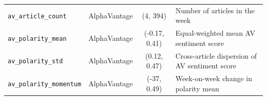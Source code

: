 \documentclass[preprint,12pt,authoryear]{elsarticle}
\begin{document}
\begin{longtable}{llcp{5.5cm}}
\texttt{av\_article\_count}        & AlphaVantage & {(}4, 394{)} & Number of articles in the week \\
\texttt{av\_polarity\_mean}        & AlphaVantage & {(}-0.17, 0.41{)}    & Equal-weighted mean AV sentiment score \\
\texttt{av\_polarity\_std}         & AlphaVantage & {(}0.12, 0.47{)}     & Cross-article dispersion of AV sentiment score \\
\texttt{av\_polarity\_momentum}    & AlphaVantage & {(}-37, 0.49{)}    & Week-on-week change in polarity mean \\

\end{longtable}


% 
% 












\end{document}
